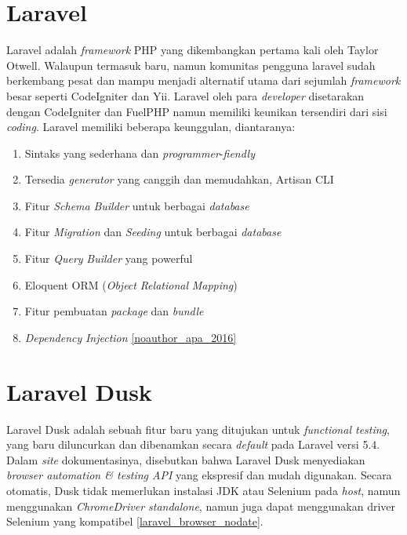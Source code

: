 	 \section{Laravel}
	 Laravel adalah \textit{framework} PHP yang dikembangkan pertama kali oleh Taylor Otwell. Walaupun termasuk baru, namun komunitas pengguna laravel sudah berkembang pesat dan mampu menjadi alternatif utama dari sejumlah \textit{framework} besar seperti CodeIgniter dan Yii. Laravel oleh para \textit{developer} disetarakan dengan CodeIgniter dan FuelPHP namun memiliki keunikan tersendiri dari sisi \textit{coding}. Laravel memiliki beberapa keunggulan, diantaranya:
	 \begin{enumerate}
	    	\item Sintaks yang sederhana dan \textit{programmer}-\textit{fiendly}
	    	\item Tersedia \textit{generator} yang canggih dan memudahkan, Artisan CLI
	    	\item Fitur \textit{Schema} \textit{Builder} untuk berbagai \textit{database}
	    	\item Fitur \textit{Migration} dan \textit{Seeding} untuk berbagai \textit{database}
	    	\item Fitur \textit{Query} \textit{Builder} yang powerful
	    	\item Eloquent ORM (\textit{Object} \textit{Relational} \textit{Mapping})
	    	\item Fitur pembuatan \textit{package} dan \textit{bundle}
	    	\item \textit{Dependency} \textit{Injection} \ref{noauthor_apa_2016}
	 \end{enumerate}
	 
	 
	\section{Laravel Dusk}
	Laravel Dusk adalah sebuah fitur baru yang ditujukan untuk \textit{functional testing}, yang baru diluncurkan dan dibenamkan secara \textit{default} pada Laravel versi 5.4. Dalam \textit{site} dokumentasinya, disebutkan bahwa Laravel Dusk menyediakan \textit{browser automation \& testing API} yang ekspresif dan mudah digunakan. Secara otomatis, Dusk tidak memerlukan instalasi JDK atau Selenium pada \textit{host}, namun menggunakan \textit{ChromeDriver standalone}, namun juga dapat menggunakan driver Selenium yang kompatibel \ref{laravel_browser_nodate}.
	     
	     
	  
